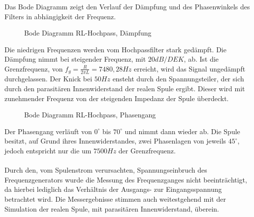 Das Bode Diagramm zeigt den Verlauf der Dämpfung und des Phasenwinkels des Filters in abhängigkeit der Frequenz.\\
\begin{figure}[H]
  \centering
  \caption{Bode Diagramm RL-Hochpass, Dämpfung}
\end{figure}
\noindent
Die niedrigen Frequenzen werden vom Hochpassfilter stark gedämpft. Die Dämpfung nimmt bei steigender Frequenz, mit $20dB/DEK$, ab. Ist die Grenzfrequenz, von
$f_g = \frac{R}{2\pi L} = 7480,28Hz$ erreicht, wird das Signal ungedämpft durchgelassen. Der Knick bei $50Hz$ ensteht durch den Spannungsteiler, der sich durch den
parasitären Innenwiderstand der realen Spule ergibt. Dieser wird mit zunehmender Frequenz von der steigenden Impedanz der Spule überdeckt.\\

\begin{figure}[H]
  \centering
  \caption{Bode Diagramm RL-Hochpass, Phasengang}
\end{figure}
\noindent
Der Phasengang verläuft von $0^\circ$ bis $70^\circ$ und nimmt dann wieder ab. Die Spule besitzt, auf Grund ihres Innenwiderstandes, zwei Phasenlagen von jeweils $45^\circ$,
jedoch entspricht nur die um $7500Hz$ der Grenzfrequenz.\\
\\
Durch den, vom Spulenstrom verursachten, Spannungseinbruch des Frequenzgenerators wurde die Messung des Frequenzganges nicht beeinträchtigt, da hierbei lediglich
das Verhältnis der Ausgangs- zur Eingangsspannung betrachtet wird. Die Messergebnisse stimmen auch weitestgehend mit der Simulation der realen Spule, mit parasitären
Innenwiderstand, überein. \\
